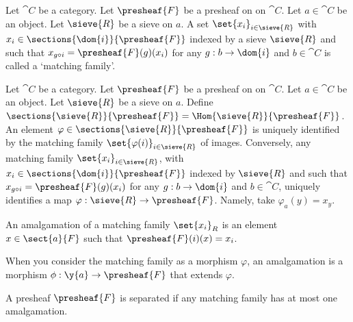 \begin{definition}
Let $\cat{C}$ be a category.
Let $\presheaf{F}$ be a presheaf on on $\cat{C}$.
Let $a \in \cat{C}$ be an object.
Let $\sieve{R}$ be a sieve on $a$.
A set $\set{x_i}_{i \in \sieve{R}}$ 
with $x_i \in \sections{\dom{i}}{\presheaf{F}}$ 
indexed by a sieve $\sieve{R}$
and such that $x_{g \circ i} = \presheaf{F}(g)(x_i)$ 
for any $g:b \rightarrow \dom{i}$ 
and $b \in \cat{C}$ is called a `matching family'.
\end{definition}

\begin{definition}
Let $\cat{C}$ be a category.
Let $\presheaf{F}$ be a presheaf on on $\cat{C}$.
Let $a \in \cat{C}$ be an object.
Let $\sieve{R}$ be a sieve on $a$.
Define $\sections{\sieve{R}}{\presheaf{F}} = \Hom{\sieve{R}}{\presheaf{F}}$.
An element $\varphi \in \sections{\sieve{R}}{\presheaf{F}}$ is uniquely identified 
by the matching family $\set{\varphi(i)}_{i\in\sieve{R}}$ of images. 
Conversely, any matching family $\set{x_i}_{i \in \sieve{R}}$, 
with $x_i \in \sections{\dom{i}}{\presheaf{F}}$ indexed by $\sieve{R}$
and such that $x_{g \circ i} = \presheaf{F}(g)(x_i)$ 
for any $g:b \rightarrow \dom{i}$ and $b \in \cat{C}$, uniquely identifies 
a map $\varphi: \sieve{R} \rightarrow \presheaf{F}$.
Namely, take $\varphi_a(y) = x_y$.
\end{definition}

\begin{definition}[Amalgamation]
An amalgamation of a matching family $\set{x_i}_R$ 
is an element $x\in \sect{a}{F}$
such that $\presheaf{F}(i)(x) = x_i$.

When you consider the matching family as a morphism $\varphi$,
an amalgamation is a morphism $\phi: \y{a} \rightarrow \presheaf{F}$
that extends $\varphi$.
\end{definition}

\begin{definition}
A presheaf $\presheaf{F}$ is separated if any matching family has at most one amalgamation.
\end{definition}